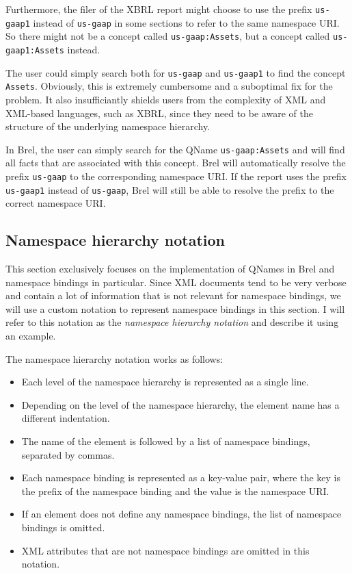 Furthermore, the filer of the XBRL report might choose to use the prefix \texttt{us-gaap1} instead of \texttt{us-gaap} in some sections to refer to the same namespace URI.
So there might not be a concept called \texttt{us-gaap:Assets}, but a concept called \texttt{us-gaap1:Assets} instead.

The user could simply search both for \texttt{us-gaap} and \texttt{us-gaap1} to find the concept \texttt{Assets}.
Obviously, this is extremely cumbersome and a suboptimal fix for the problem.
It also insufficiantly shields users from the complexity of XML and XML-based languages, such as XBRL, 
since they need to be aware of the structure of the underlying namespace hierarchy.

In Brel, the user can simply search for the QName \texttt{us-gaap:Assets} and will find all facts that are associated with this concept.
Brel will automatically resolve the prefix \texttt{us-gaap} to the corresponding namespace URI.
If the report uses the prefix \texttt{us-gaap1} instead of \texttt{us-gaap}, Brel will still be able to resolve the prefix to the correct namespace URI.

\subsection{Namespace hierarchy notation}

This section exclusively focuses on the implementation of QNames in Brel and namespace bindings in particular. 
Since XML documents tend to be very verbose and contain a lot of information that is not relevant for namespace bindings,
we will use a custom notation to represent namespace bindings in this section. 
I will refer to this notation as the \textit{namespace hierarchy notation} and describe it using an example.

The namespace hierarchy notation works as follows:

\begin{itemize}
    \item Each level of the namespace hierarchy is represented as a single line.
    \item Depending on the level of the namespace hierarchy, the element name has a different indentation.
    \item The name of the element is followed by a list of namespace bindings, separated by commas.
    \item Each namespace binding is represented as a key-value pair, where the key is the prefix of the namespace binding and the value is the namespace URI.
    \item If an element does not define any namespace bindings, the list of namespace bindings is omitted.
    \item XML attributes that are not namespace bindings are omitted in this notation.
\end{itemize}

